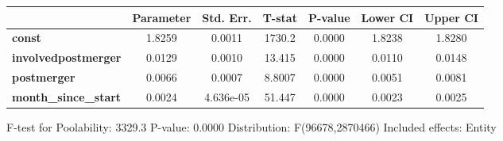 \documentclass{report}
\begin{document}
\begin{center}
\begin{tabular}{lcccccc}
                             & \textbf{Parameter} & \textbf{Std. Err.} & \textbf{T-stat} & \textbf{P-value} & \textbf{Lower CI} & \textbf{Upper CI}  \\
\midrule
\textbf{const}               &       1.8259       &       0.0011       &      1730.2     &      0.0000      &       1.8238      &       1.8280       \\
\textbf{involvedpostmerger}  &       0.0129       &       0.0010       &      13.415     &      0.0000      &       0.0110      &       0.0148       \\
\textbf{postmerger}          &       0.0066       &       0.0007       &      8.8007     &      0.0000      &       0.0051      &       0.0081       \\
\textbf{month\_since\_start} &       0.0024       &     4.636e-05      &      51.447     &      0.0000      &       0.0023      &       0.0025       \\
\bottomrule
\end{tabular}
\end{center}

F-test for Poolability: 3329.3 \newline
 P-value: 0.0000 \newline
 Distribution: F(96678,2870466) \newline
  \newline
 Included effects: Entity
\end{document}
